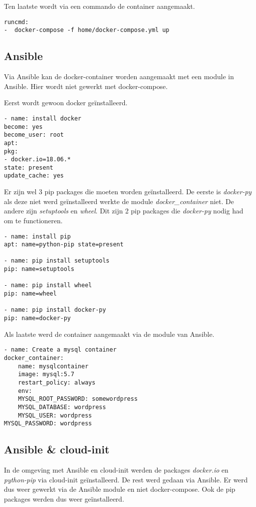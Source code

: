 Ten laatste wordt via een commando de container aangemaakt.
\begin{lstlisting}[basicstyle=\small]
runcmd:
-  docker-compose -f home/docker-compose.yml up
\end{lstlisting}

\subsection{Ansible}
Via Ansible kan de docker-container worden aangemaakt met een module in Ansible. Hier wordt niet gewerkt met docker-compose.

Eerst wordt gewoon docker geïnstalleerd.
\begin{lstlisting}[basicstyle=\small]
- name: install docker
become: yes
become_user: root
apt:
pkg:
- docker.io=18.06.*
state: present
update_cache: yes
\end{lstlisting}

Er zijn wel 3 pip packages die moeten worden geïnstalleerd. De eerste is \textit{docker-py} als deze niet werd geïnstalleerd werkte de module \textit{docker\_container} niet. De andere zijn \textit{setuptools} en \textit{wheel}. Dit zijn 2 pip packages die \textit{docker-py} nodig had om te functioneren.
\begin{lstlisting}[basicstyle=\small]
- name: install pip
apt: name=python-pip state=present

- name: pip install setuptools
pip: name=setuptools

- name: pip install wheel
pip: name=wheel

- name: pip install docker-py
pip: name=docker-py
\end{lstlisting}

Als laatste werd de container aangemaakt via de module van Ansible.
\begin{lstlisting}[basicstyle=\small]
- name: Create a mysql container
docker_container:
    name: mysqlcontainer
    image: mysql:5.7
    restart_policy: always
    env:
    MYSQL_ROOT_PASSWORD: somewordpress
    MYSQL_DATABASE: wordpress
    MYSQL_USER: wordpress
MYSQL_PASSWORD: wordpress
\end{lstlisting}

\subsection{Ansible \& cloud-init}
In de omgeving met Ansible en cloud-init werden de packages \textit{docker.io} en \textit{python-pip} via cloud-init geïnstalleerd. De rest werd gedaan via Ansible. Er werd dus weer gewerkt via de Ansible module en niet docker-compose. Ook de pip packages werden dus weer geïnstalleerd.

